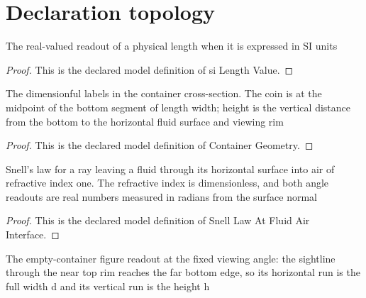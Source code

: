 \section{Declaration topology}
\begin{definition}
  \label{def:physics:phyx-mini-0005:phyxminiproblems-problemphyxmini0005-silengthvalue}
  The real-valued readout of a physical length when it is expressed in SI units
\end{definition}
\begin{proof}
  This is the declared model definition of si Length Value.
\end{proof}
\begin{definition}
  \label{def:physics:phyx-mini-0005:phyxminiproblems-problemphyxmini0005-containergeometry}
  The dimensionful labels in the container cross-section. The coin is at the midpoint of the bottom segment of length width; height is the vertical distance from the bottom to the horizontal fluid surface and viewing rim
\end{definition}
\begin{proof}
  This is the declared model definition of Container Geometry.
\end{proof}
\begin{definition}
  \label{def:physics:phyx-mini-0005:phyxminiproblems-problemphyxmini0005-snelllawatfluidairinterface}
  Snell's law for a ray leaving a fluid through its horizontal surface into air of refractive index one. The refractive index is dimensionless, and both angle readouts are real numbers measured in radians from the surface normal
\end{definition}
\begin{proof}
  This is the declared model definition of Snell Law At Fluid Air Interface.
\end{proof}
\begin{definition}
  \label{def:physics:phyx-mini-0005:phyxminiproblems-problemphyxmini0005-emptycontainerfaredgesightline}
  The empty-container figure readout at the fixed viewing angle: the sightline through the near top rim reaches the far bottom edge, so its horizontal run is the full width d and its vertical run is the height h
\end{definition}
